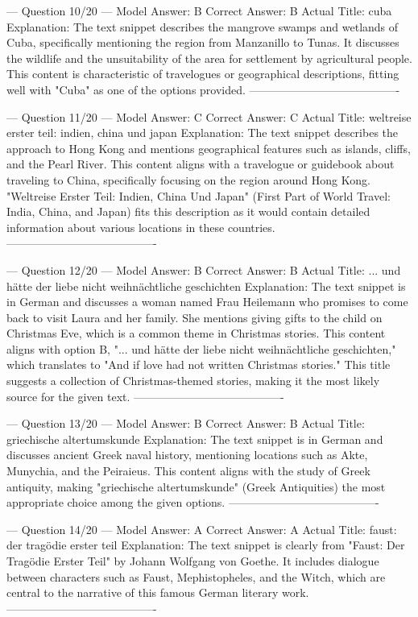 \documentclass[11pt]{article}
\begin{document}
{--- Question 10/20 ---
Model Answer:    B	
Correct Answer:  B
Actual Title:    cuba
Explanation:     The text snippet describes the mangrove swamps and wetlands of Cuba, specifically mentioning the region from Manzanillo to Tunas. It discusses the wildlife and the unsuitability of the area for settlement by agricultural people. This content is characteristic of travelogues or geographical descriptions, fitting well with "Cuba" as one of the options provided.
----------------------------------------

--- Question 11/20 ---
Model Answer:    C
Correct Answer:  C
Actual Title:    weltreise erster teil: indien, china und japan
Explanation:     The text snippet describes the approach to Hong Kong and mentions geographical features such as islands, cliffs, and the Pearl River. This content aligns with a travelogue or guidebook about traveling to China, specifically focusing on the region around Hong Kong. "Weltreise Erster Teil: Indien, China Und Japan" (First Part of World Travel: India, China, and Japan) fits this description as it would contain detailed information about various locations in these countries.
----------------------------------------

--- Question 12/20 ---
Model Answer:    B
Correct Answer:  B
Actual Title:    ... und hätte der liebe nicht weihnächtliche geschichten
Explanation:     The text snippet is in German and discusses a woman named Frau Heilemann who promises to come back to visit Laura and her family. She mentions giving gifts to the child on Christmas Eve, which is a common theme in Christmas stories. This content aligns with option B, "... und hätte der liebe nicht weihnächtliche geschichten," which translates to "And if love had not written Christmas stories." This title suggests a collection of Christmas-themed stories, making it the most likely source for the given text.
----------------------------------------

--- Question 13/20 ---
Model Answer:    B
Correct Answer:  B
Actual Title:    griechische altertumskunde
Explanation:     The text snippet is in German and discusses ancient Greek naval history, mentioning locations such as Akte, Munychia, and the Peiraieus. This content aligns with the study of Greek antiquity, making "griechische altertumskunde" (Greek Antiquities) the most appropriate choice among the given options.
----------------------------------------

--- Question 14/20 ---
Model Answer:    A
Correct Answer:  A
Actual Title:    faust: der tragödie erster teil
Explanation:     The text snippet is clearly from "Faust: Der Tragödie Erster Teil" by Johann Wolfgang von Goethe. It includes dialogue between characters such as Faust, Mephistopheles, and the Witch, which are central to the narrative of this famous German literary work.
----------------------------------------

}
\end{document}

